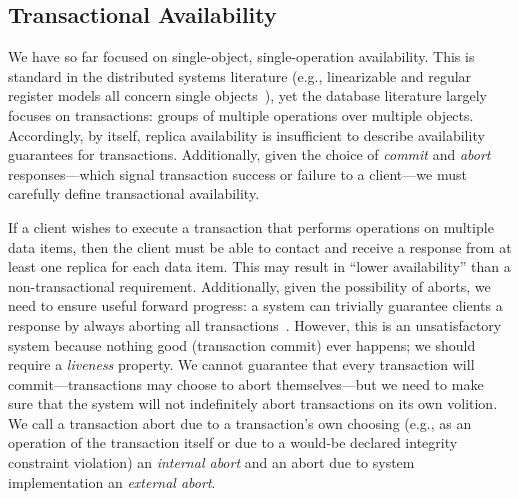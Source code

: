 

\subsection{Transactional Availability}

We have so far focused on single-object, single-operation
availability. This is standard in the distributed systems literature
(e.g., linearizable and regular register models all concern single
objects~\cite{herlihy-art}), yet the database literature largely
focuses on transactions: groups of multiple operations over multiple
objects. Accordingly, by itself, replica availability is insufficient
to describe availability guarantees for transactions. Additionally,
given the choice of \textit{commit} and \textit{abort}
responses---which signal transaction success or failure to a
client---we must carefully define transactional availability.

If a client wishes to execute a transaction that performs operations
on multiple data items, then the client must be able to contact and
receive a response from at least one replica for each data item. This
may result in ``lower availability'' than a non-transactional
requirement. Additionally, given the possibility of aborts, we need to
ensure useful forward progress: a system can trivially guarantee
clients a response by always aborting all
transactions~\cite{transaction-liveness}. However, this is an
unsatisfactory system because nothing good (transaction commit) ever
happens; we should require a \textit{liveness} property. We cannot
guarantee that every transaction will commit---transactions may choose
to abort themselves---but we need to make sure that the system will
not indefinitely abort transactions on its own volition. We call a
transaction abort due to a transaction's own choosing (e.g., as an
operation of the transaction itself or due to a would-be declared
integrity constraint violation) an \textit{internal abort} and an
abort due to system implementation an \textit{external abort}.

